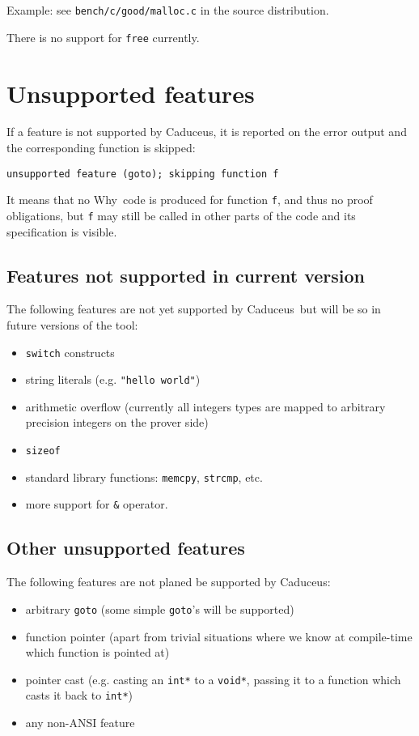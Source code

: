 \documentclass[12pt,a4paper,twoside,openright]{report}
\newcommand{\why}{\textsf{Why}}
\newcommand{\caduceus}{\textsf{Caduceus}}
\begin{document}
Example: see \texttt{bench/c/good/malloc.c} in the source distribution.

There is no support for \texttt{free} currently.

\section{Unsupported features}

If a feature is not supported by \caduceus, it is reported on the
error output and the corresponding function is skipped:
\begin{verbatim}
unsupported feature (goto); skipping function f
\end{verbatim}
It means that no \why\ code is produced for function \texttt{f}, and
thus no proof obligations, but \texttt{f} may still be called in other
parts of the code and its specification is visible.

\subsection{Features not supported in current version}
The following features are not yet supported by \caduceus\ but will be
so in future versions of the tool:
\begin{itemize}
\item \texttt{switch} constructs
\item string literals (e.g. \texttt{"hello world"})
\item arithmetic overflow (currently all integers types are mapped to
  arbitrary precision integers on the prover side)
\item \texttt{sizeof}
\item standard library functions: \texttt{memcpy},
  \texttt{strcmp}, etc.
\item more support for \verb|&| operator.
\end{itemize}

\subsection{Other unsupported features}
The following features are not planed be supported by \caduceus:
\begin{itemize}
\item arbitrary \texttt{goto} (some simple \texttt{goto}'s will be supported)
\item function pointer (apart from trivial situations where we know at
  compile-time which function is pointed at)
\item pointer cast (e.g. casting an \texttt{int*} to a \texttt{void*},
  passing it to a function which casts it back to \texttt{int*})
\item any non-ANSI feature
\end{itemize}



\nocite{*}




\tableofcontents

{}
\printindex
\end{document}
